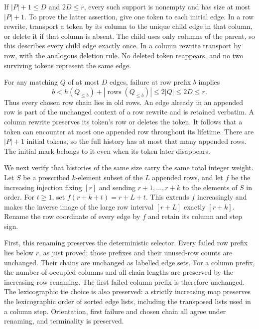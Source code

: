 \documentclass[11pt,a4paper]{article}
\theoremstyle{definition}\newtheorem{definition}[theorem]{Definition}
\theoremstyle{remark}\newtheorem{remark}[theorem]{Remark}
\begin{document}
If $|P|+1\leq D$ and $2D\leq r$, every such support is nonempty and has
size at most $|P|+1$.  To prove the latter assertion, give one token to
each initial edge.  In a row rewrite, transport a token by its column
to the unique child edge in that column, or delete it if that column
is absent.  The child uses only columns of the parent, so this describes
every child edge exactly once.  In a column rewrite transport by row,
with the analogous deletion rule.  No deleted token reappears, and no
two surviving tokens represent the same edge.

For any matching $Q$ of at most $D$ edges, failure at row prefix $b$
implies
\[
 b< h(Q_{\leq b})+
       |\operatorname{rows}(Q_{\leq b})|\leq 2|Q|\leq2D\leq r.
\]
Thus every chosen row chain lies in old rows.  An edge already in an
appended row is part of the unchanged context of a row rewrite and is
retained verbatim.  A column rewrite preserves its token's row or
deletes the token.  It follows that a token can encounter at most one
appended row throughout its lifetime.  There are $|P|+1$ initial tokens,
so the full history has at most that many appended rows.  The initial
mark belongs to it even when its token later disappears.

We next verify that histories of the same size carry the same total
integer weight.  Let $S$ be a prescribed $k$-element subset of the $L$
appended rows, and let $f$ be the increasing injection fixing $[r]$ and
sending $r+1,\ldots,r+k$ to the elements of $S$ in order.  For $t\geq1$, set $f(r+k+t)=r+L+t$.
This extends $f$ increasingly and makes the inverse image of the large
row interval $[r+L]$ exactly $[r+k]$.  Rename the row coordinate of every
edge by $f$ and retain its column and step sign.

First, this renaming preserves the deterministic selector.  Every failed
row prefix lies below $r$, as just proved; those prefixes and their
unused-row counts are unchanged.  Their chains are unchanged as labelled
edge sets.  For a column prefix, the number of occupied columns and all
chain lengths are preserved by the increasing row renaming.  The first
failed column prefix is therefore unchanged.  The lexicographic tie
choice is also preserved: a strictly increasing map preserves the
lexicographic order of sorted edge lists, including the transposed lists
used in a column step.  Orientation, first failure and chosen chain all
agree under renaming, and terminality is preserved.
\end{document}
